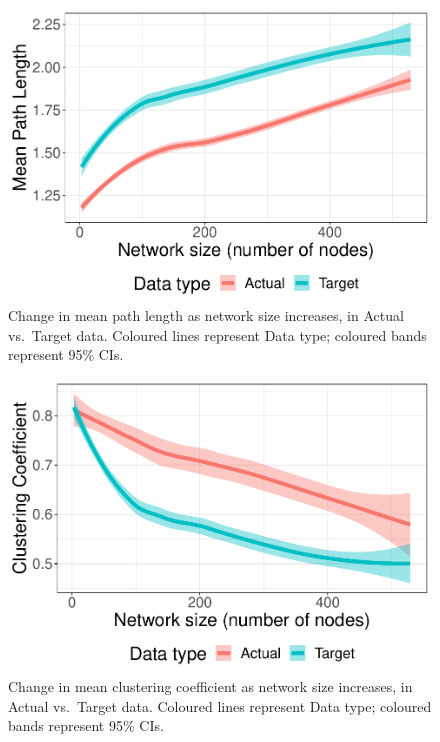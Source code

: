 \documentclass[
  man]{apa6}
\begin{document}
\begin{figure}
\centering
\includegraphics{NetworkGraphs_files/figure-latex/Figure-path-length-DT-1.pdf}
\caption{\label{fig:Figure-path-length-DT}Change in mean path length as network size increases, in Actual vs.~Target data. Coloured lines represent Data type; coloured bands represent 95\% CIs.}
\end{figure}

\begin{figure}
\centering
\includegraphics{NetworkGraphs_files/figure-latex/Figure-clust-coef-DT-1.pdf}
\caption{\label{fig:Figure-clust-coef-DT}Change in mean clustering coefficient as network size increases, in Actual vs.~Target data. Coloured lines represent Data type; coloured bands represent 95\% CIs.}
\end{figure}
\end{document}
